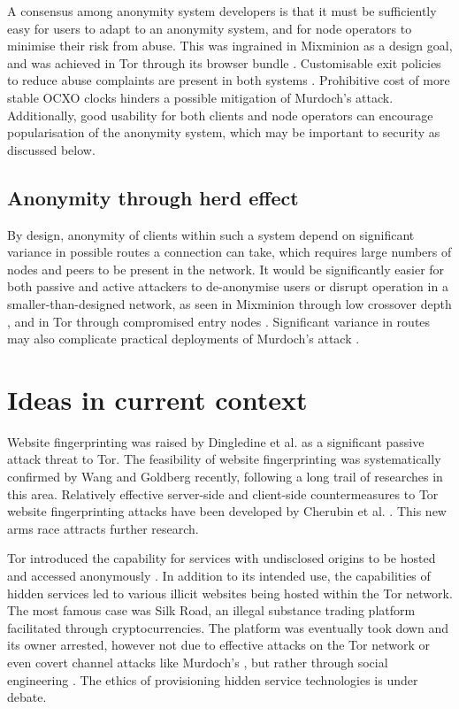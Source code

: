 \documentclass[11pt]{article}
\begin{document}
A consensus among anonymity system developers is that it must be sufficiently easy for users to adapt to an anonymity system, and for node operators to minimise their risk from abuse. This was ingrained in Mixminion \cite[Sec. 3]{danezis2003mixminion} as a design goal, and was achieved in Tor through its browser bundle \cite[4.5]{dingledine2014tor}. Customisable exit policies to reduce abuse complaints are present in both systems \cite[5.3]{danezis2003mixminion}\cite[6.2]{dingledine2014tor}. Prohibitive cost of more stable OCXO clocks \cite[4.2]{murdoch2006hot} hinders a possible mitigation of Murdoch's attack. Additionally, good usability for both clients and node operators can encourage popularisation of the anonymity system, which may be important to security as discussed below.

\subsection{Anonymity through herd effect}

By design, anonymity of clients within such a system depend on significant variance in possible routes a connection can take, which requires large numbers of nodes and peers to be present in the network. It would be significantly easier for both passive and active attackers to de-anonymise users or disrupt operation in a smaller-than-designed network, as seen in Mixminion through low crossover depth \cite[4.3]{danezis2003mixminion}, and in Tor through compromised entry nodes \cite[Sec. 7]{dingledine2014tor}. Significant variance in routes may also complicate practical deployments of Murdoch's attack \cite{murdoch2006hot}.
 
\section{Ideas in current context}

Website fingerprinting was raised by Dingledine et al. \cite[Sec. 7]{dingledine2014tor} as a significant passive attack threat to Tor. The feasibility of website fingerprinting was systematically confirmed by Wang and Goldberg \cite{wang2016realistically} recently, following a long trail of researches in this area. Relatively effective server-side and client-side countermeasures to Tor website fingerprinting attacks have been developed by Cherubin et al. \cite{cherubin2017website}. This new arms race attracts further research.

Tor introduced the capability for services with undisclosed origins to be hosted and accessed anonymously \cite[Sec. 5]{dingledine2014tor}. In addition to its intended use, the capabilities of hidden services led to various illicit websites being hosted within the Tor network. The most famous case was Silk Road, an illegal substance trading platform facilitated through cryptocurrencies. The platform was eventually took down and its owner arrested, however not due to effective attacks on the Tor network or even covert channel attacks like Murdoch's \cite{murdoch2006hot}, but rather through social engineering \cite{silkroad}. The ethics of provisioning hidden service technologies is under debate.
\end{document}
